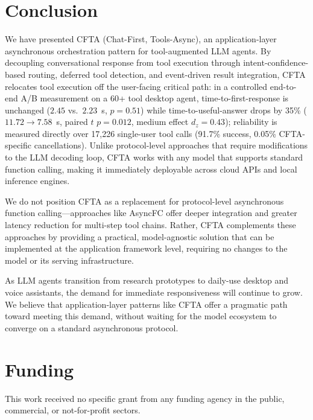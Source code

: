 \documentclass[numbered,mediumone,traditional]{oup-authoring-template}
\begin{document}
\section{Conclusion}

We have presented CFTA (Chat-First, Tools-Async), an application-layer asynchronous orchestration pattern for tool-augmented LLM agents. By decoupling conversational response from tool execution through intent-confidence-based routing, deferred tool detection, and event-driven result integration, CFTA relocates tool execution off the user-facing critical path: in a controlled end-to-end A/B measurement on a 60+ tool desktop agent, time-to-first-response is unchanged ($2.45$ vs.\ $2.23$~s, $p = 0.51$) while time-to-useful-answer drops by 35\% ($11.72 \to 7.58$~s, paired $t$ $p = 0.012$, medium effect $d_z = 0.43$); reliability is measured directly over 17,226 single-user tool calls (91.7\% success, 0.05\% CFTA-specific cancellations). Unlike protocol-level approaches that require modifications to the LLM decoding loop, CFTA works with any model that supports standard function calling, making it immediately deployable across cloud APIs and local inference engines.

We do not position CFTA as a replacement for protocol-level asynchronous function calling---approaches like AsyncFC offer deeper integration and greater latency reduction for multi-step tool chains. Rather, CFTA complements these approaches by providing a practical, model-agnostic solution that can be implemented at the application framework level, requiring no changes to the model or its serving infrastructure.

As LLM agents transition from research prototypes to daily-use desktop and voice assistants, the demand for immediate responsiveness will continue to grow. We believe that application-layer patterns like CFTA offer a pragmatic path toward meeting this demand, without waiting for the model ecosystem to converge on a standard asynchronous protocol.

\section*{Funding}

This work received no specific grant from any funding agency in the public, commercial, or not-for-profit sectors.
\end{document}
